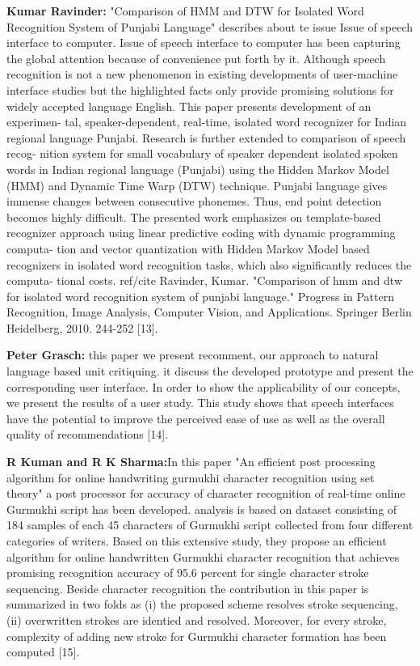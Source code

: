 \documentclass[12pt,a4paper,oneside]{memoir}
\begin{document}
\textbf{Kumar Ravinder:} "Comparison of HMM and DTW for Isolated Word Recognition System of Punjabi Language" describes about te issue Issue of speech interface to computer.
Issue of speech interface to computer has been capturing the global
attention because of convenience put forth by it. Although speech recognition is
not a new phenomenon in existing developments of user-machine interface
studies but the highlighted facts only provide promising solutions for widely
accepted language English. This paper presents development of an experimen-
tal, speaker-dependent, real-time, isolated word recognizer for Indian regional
language Punjabi. Research is further extended to comparison of speech recog-
nition system for small vocabulary of speaker dependent isolated spoken words
in Indian regional language (Punjabi) using the Hidden Markov Model (HMM)
and Dynamic Time Warp (DTW) technique. Punjabi language gives immense
changes between consecutive phonemes. Thus, end point detection becomes
highly difficult. The presented work emphasizes on template-based recognizer
approach using linear predictive coding with dynamic programming computa-
tion and vector quantization with Hidden Markov Model based recognizers in
isolated word recognition tasks, which also significantly reduces the computa-
tional costs. ref/cite Ravinder, Kumar. "Comparison of hmm and dtw for isolated word recognition system of punjabi language." Progress in Pattern Recognition, Image Analysis, Computer Vision, and Applications. Springer Berlin Heidelberg, 2010. 244-252 [13].

\textbf{Peter Grasch:} this paper we present recomment, our
approach to natural language based unit critiquing. it discuss the
developed prototype and present the corresponding user interface.
In order to show the applicability of our concepts, we present the
results of a user study. This study shows that speech interfaces
have the potential to improve the perceived ease of use as well as
the overall quality of recommendations [14].  

\textbf{R Kuman and R K Sharma:}In this paper "An efficient post processing algorithm for online handwriting gurmukhi character recognition using set theory" a post processor for accuracy of character recognition of real-time online Gurmukhi script has been developed.  analysis is based on dataset consisting of 184 samples of
each 45 characters of Gurmukhi script collected from four different categories of writers. Based
on this extensive study, they  propose an efficient  algorithm for online handwritten Gurmukhi
character recognition that achieves promising recognition accuracy of 95.6 percent for single character
stroke sequencing. Beside character recognition the contribution in this paper is summarized
in two folds as (i) the proposed scheme resolves stroke sequencing, (ii) overwritten strokes
are identied and resolved. Moreover, for every stroke, complexity of adding new stroke for
Gurmukhi character formation has been computed [15].  
\end{document}
